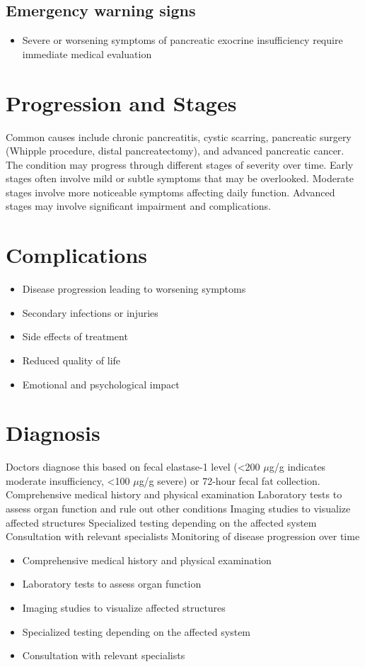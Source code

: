 \subsection{Emergency warning signs}
\begin{itemize}[noitemsep]
  \item Severe or worsening symptoms of pancreatic exocrine insufficiency require immediate medical evaluation
\end{itemize}
\section{Progression and Stages}
Common causes include chronic pancreatitis, cystic scarring, pancreatic surgery (Whipple procedure, distal pancreatectomy), and advanced pancreatic cancer. The condition may progress through different stages of severity over time. Early stages often involve mild or subtle symptoms that may be overlooked. Moderate stages involve more noticeable symptoms affecting daily function. Advanced stages may involve significant impairment and complications.
\section{Complications}
\begin{itemize}[noitemsep]
  \item Disease progression leading to worsening symptoms
  \item Secondary infections or injuries
  \item Side effects of treatment
  \item Reduced quality of life
  \item Emotional and psychological impact
\end{itemize}
\section{Diagnosis}
Doctors diagnose this based on fecal elastase-1 level (<200 $\mu$g/g indicates moderate insufficiency, <100 $\mu$g/g severe) or 72-hour fecal fat collection. Comprehensive medical history and physical examination Laboratory tests to assess organ function and rule out other conditions Imaging studies to visualize affected structures Specialized testing depending on the affected system Consultation with relevant specialists Monitoring of disease progression over time

\begin{itemize}[noitemsep]
  \item Comprehensive medical history and physical examination
  \item Laboratory tests to assess organ function
  \item Imaging studies to visualize affected structures
  \item Specialized testing depending on the affected system
  \item Consultation with relevant specialists
\end{itemize}

